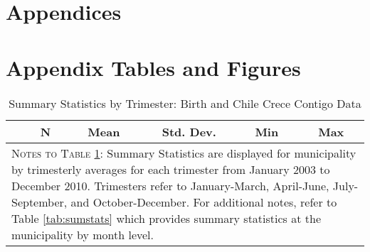\documentclass[12pt]{article}
\begin{document}
\begin{spacing}{1.4}
\newpage

\newpage


\clearpage
\setcounter{table}{0}
\renewcommand{\thetable}{A\arabic{table}}
\setcounter{figure}{0}
\renewcommand{\thefigure}{A\arabic{figure}}
\renewcommand{\thepage}{A\arabic{page}}
\appendix
\section*{Appendices}

\section{Appendix Tables and Figures}


\begin{table}[htpb!]
  \begin{center}
    \caption{Summary Statistics by Trimester: Birth and Chile Crece Contigo Data}
    \label{tab:sumstatsTri}
    \begin{tabular}{lccccc} \toprule
      & N& Mean & Std. Dev. & Min & Max \\ \midrule
       \bottomrule
      \multicolumn{6}{p{14.4cm}}{{\footnotesize \textsc{Notes to Table
            \ref{tab:sumstatsTri}}: Summary Statistics are displayed for
          municipality by trimesterly averages for
          each trimester from January 2003 to December 2010.  Trimesters
          refer to January-March, April-June, July-September, and
          October-December.  For additional notes, refer to Table
          \ref{tab:sumstats} which provides summary statistics at the
          municipality by month level.
      }}
      \end{tabular}
  \end{center}
\end{table}

\begin{landscape}

\end{landscape}


\end{spacing}
\end{document}
